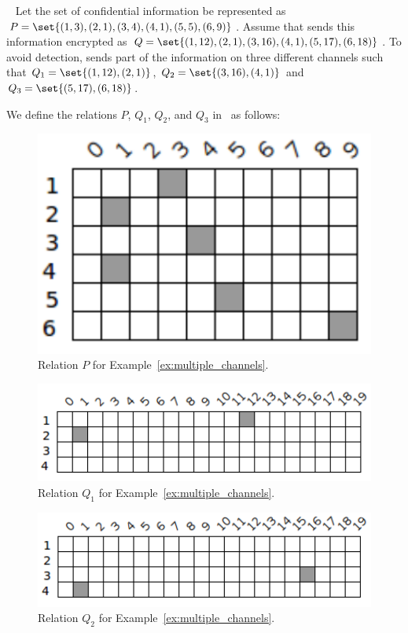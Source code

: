\begin{example}~
\label{ex:multiple_channels}
	Let the set of confidential information be represented as $P = \set{(1,3),(2,1),(3,4),(4,1),(5,5),(6,9)}$. Assume that \AgentOne sends this information encrypted as $Q = \set{(1,12),(2,1),(3,16),(4,1),(5,17),(6,18)}$. To avoid detection, \AgentOne sends part of the information on three different channels such that $Q_1 = \set{(1,12),(2,1)}$, $Q_2 = \set{(3,16),(4,1)}$ and $Q_3 = \set{(5,17),(6,18)}$. \newline 

	We define the relations $P$, $Q_1$, $Q_2$, and $Q_3$ in \relview\ as follows: \newline

	\begin{figure}[ht]
		\centering
		\includegraphics[scale=0.65]{Figures/PDF/Relview/P.pdf}
		\caption{Relation $P$ for Example~\ref{ex:multiple_channels}.}
		\label{fig:multiple_channels_p}
	\end{figure}

	\begin{figure}[ht]
		\centering
		\includegraphics[scale=0.65]{Figures/PDF/Relview/QQ1.pdf}
		\caption{Relation $Q_1$ for Example~\ref{ex:multiple_channels}.}
		\label{fig:multiple_channels_q1}
	\end{figure}
	
	\begin{figure}[ht]
		\centering
		\includegraphics[scale=0.65]{Figures/PDF/Relview/QQ2.pdf}
		\caption{Relation $Q_2$ for Example~\ref{ex:multiple_channels}.}
		\label{fig:multiple_channels_q2}
	\end{figure}
	

\end{example}
